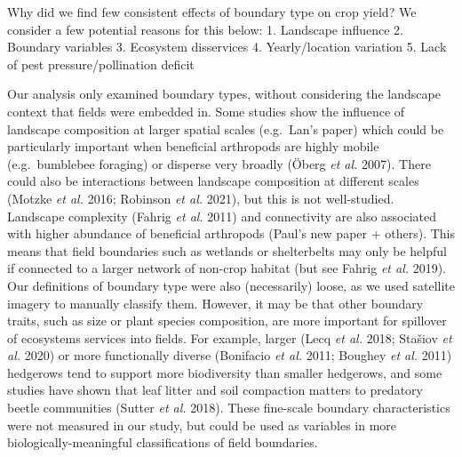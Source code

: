 \documentclass[]{elsarticle} %
\begin{document}
Why did we find few consistent effects of boundary type on crop yield?
We consider a few potential reasons for this below:
1. Landscape influence
2. Boundary variables
3. Ecosystem disservices
4. Yearly/location variation
5. Lack of pest pressure/pollination deficit

Our analysis only examined boundary types, without considering the landscape context that fields were embedded in.
Some studies show the influence of landscape composition at larger spatial scales (e.g.~Lan's paper) which could be particularly important when beneficial arthropods are highly mobile (e.g.~bumblebee foraging) or disperse very broadly (Öberg \emph{et al.} 2007).
There could also be interactions between landscape composition at different scales (Motzke \emph{et al.} 2016; Robinson \emph{et al.} 2021), but this is not well-studied.
Landscape complexity (Fahrig \emph{et al.} 2011) and connectivity are also associated with higher abundance of beneficial arthropods (Paul's new paper + others).
This means that field boundaries such as wetlands or shelterbelts may only be helpful if connected to a larger network of non-crop habitat (but see Fahrig \emph{et al.} 2019).
Our definitions of boundary type were also (necessarily) loose, as we used satellite imagery to manually classify them.
However, it may be that other boundary traits, such as size or plant species composition, are more important for spillover of ecosystems services into fields.
For example, larger (Lecq \emph{et al.} 2018; Stašiov \emph{et al.} 2020) or more functionally diverse (Bonifacio \emph{et al.} 2011; Boughey \emph{et al.} 2011) hedgerows tend to support more biodiversity than smaller hedgerows, and some studies have shown that leaf litter and soil compaction matters to predatory beetle communities (Sutter \emph{et al.} 2018).
These fine-scale boundary characteristics were not measured in our study, but could be used as variables in more biologically-meaningful classifications of field boundaries.
\end{document}
